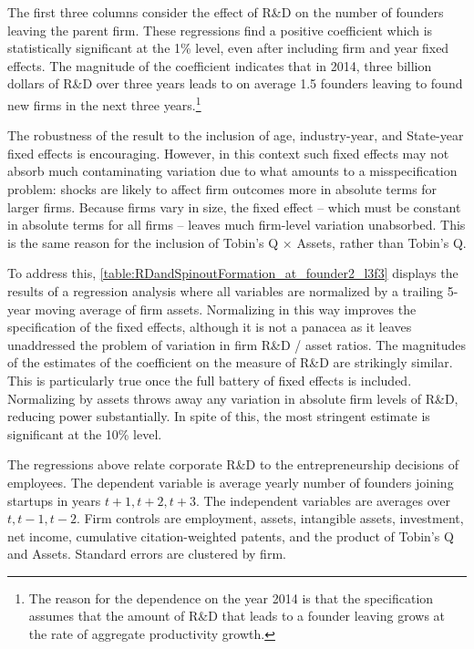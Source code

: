 \documentclass[11pt,english]{article}
\begin{document}
The first three columns consider the effect of R\&D on the number of founders leaving the parent firm. These regressions find a positive coefficient which is statistically significant at the 1\% level, even after including firm and year fixed effects. The magnitude of the coefficient indicates that in 2014, three billion dollars of R\&D over three years leads to on average 1.5 founders leaving to found new firms in the next three years.\footnote{The reason for the dependence on the year 2014 is that the specification assumes that the amount of R\&D that leads to a founder leaving grows at the rate of aggregate productivity growth.}

The robustness of the result to the inclusion of age, industry-year, and State-year fixed effects is encouraging. However, in this context such fixed effects may not absorb much contaminating variation due to what amounts to a misspecification problem: shocks are likely to affect firm outcomes more in absolute terms for larger firms. Because firms vary in size, the fixed effect -- which must be constant in absolute terms for all firms -- leaves much firm-level variation unabsorbed. This is the same reason for the inclusion of Tobin's Q $\times$ Assets, rather than Tobin's Q. 

To address this, \autoref{table:RDandSpinoutFormation_at_founder2_l3f3} displays the results of a regression analysis where all variables are normalized by a trailing 5-year moving average of firm assets. Normalizing in this way improves the specification of the fixed effects, although it is not a panacea as it leaves unaddressed the problem of variation in firm R\&D / asset ratios. The magnitudes of the estimates of the coefficient on the measure of R\&D are strikingly similar. This is particularly true once the full battery of fixed effects is included. Normalizing by assets throws away any variation in absolute firm levels of R\&D, reducing power substantially. In spite of this, the most stringent estimate is significant at the 10\% level.

\begin{table}[!htb]
	\scriptsize
	\centering
	
	\caption{The regressions above relate corporate R\&D to the entrepreneurship decisions of employees. The dependent variable is average yearly number of founders joining startups in years $t+1,t+2,t+3$. The independent variables are averages over $t,t-1,t-2$. Firm controls are employment, assets, intangible assets, investment, net income, cumulative citation-weighted patents, and the product of Tobin's Q and Assets. Standard errors are clustered by firm.}
	\label{table:RDandSpinoutFormation_absolute_founder2_l3f3}
\end{table}
\end{document}
